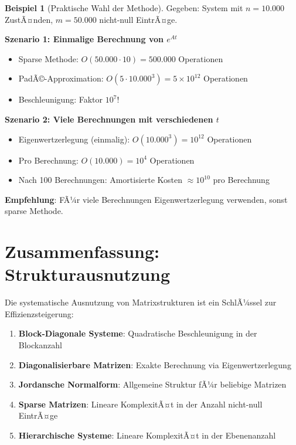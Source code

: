 ﻿\documentclass[a4paper,12pt]{report}
\theoremstyle{definition}
\newtheorem{beispiel}{Beispiel}
\begin{document}
	\begin{beispiel}[Praktische Wahl der Methode]
		Gegeben: System mit $n = 10.000$ ZustÃ¤nden, $m = 50.000$ nicht-null EintrÃ¤ge.
		
		\textbf{Szenario 1: Einmalige Berechnung von $e^{At}$}
		\begin{itemize}
			\item Sparse Methode: $O(50.000 \cdot 10) = 500.000$ Operationen
			\item PadÃ©-Approximation: $O(5 \cdot 10.000^3) = 5 \times 10^{12}$ Operationen
			\item Beschleunigung: Faktor $10^7$!
		\end{itemize}
		
		\textbf{Szenario 2: Viele Berechnungen mit verschiedenen $t$}
		\begin{itemize}
			\item Eigenwertzerlegung (einmalig): $O(10.000^3) = 10^{12}$ Operationen
			\item Pro Berechnung: $O(10.000) = 10^4$ Operationen
			\item Nach 100 Berechnungen: Amortisierte Kosten $\approx 10^{10}$ pro Berechnung
		\end{itemize}
		
		\textbf{Empfehlung}: FÃ¼r viele Berechnungen Eigenwertzerlegung verwenden, sonst sparse Methode.
	\end{beispiel}
	
	\section{Zusammenfassung: Strukturausnutzung}
	
	Die systematische Ausnutzung von Matrixstrukturen ist ein SchlÃ¼ssel zur Effizienzsteigerung:
	
	\begin{enumerate}
		\item \textbf{Block-Diagonale Systeme}: Quadratische Beschleunigung in der Blockanzahl
		\item \textbf{Diagonalisierbare Matrizen}: Exakte Berechnung via Eigenwertzerlegung
		\item \textbf{Jordansche Normalform}: Allgemeine Struktur fÃ¼r beliebige Matrizen
		\item \textbf{Sparse Matrizen}: Lineare KomplexitÃ¤t in der Anzahl nicht-null EintrÃ¤ge
		\item \textbf{Hierarchische Systeme}: Lineare KomplexitÃ¤t in der Ebenenanzahl
	\end{enumerate}
	
\end{document}

